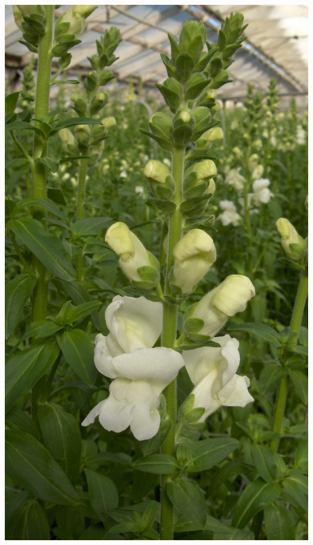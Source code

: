 \documentclass{article}
\begin{document}
\begin{center}
\includegraphics[height=0.9\textheight, angle=90]{../Snapdragon.jpg}
\end{center}
\newpage
\end{document}
